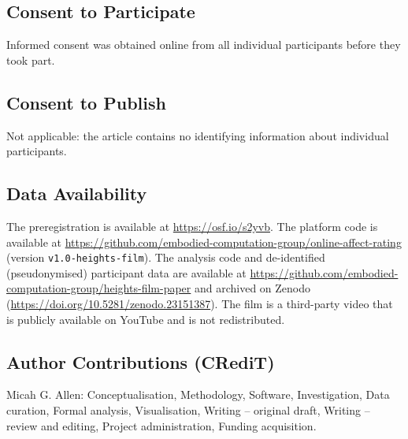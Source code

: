 \documentclass[man,12pt,british]{apa7}
\begin{document}
\subsection*{Consent to Participate}
Informed consent was obtained online from all individual participants before they took part.

\subsection*{Consent to Publish}
Not applicable: the article contains no identifying information about individual participants.

\subsection*{Data Availability}
The preregistration is available at \url{https://osf.io/s2yvb}.
The platform code is available at \url{https://github.com/embodied-computation-group/online-affect-rating}
(version \texttt{v1.0-heights-film}). The analysis
code and de-identified (pseudonymised) participant data are available at
\url{https://github.com/embodied-computation-group/heights-film-paper} and archived on Zenodo
(\url{https://doi.org/10.5281/zenodo.23151387}). The film is a third-party video
that is publicly available on YouTube \parencite{tikhomirov2017dubai} and is not redistributed.

\subsection*{Author Contributions (CRediT)}
\enlargethispage{\baselineskip}
Micah G. Allen: Conceptualisation, Methodology, Software, Investigation, Data
curation, Formal analysis, Visualisation, Writing -- original draft, Writing -- review and editing, Project
administration, Funding acquisition.

\printbibliography
\end{document}
